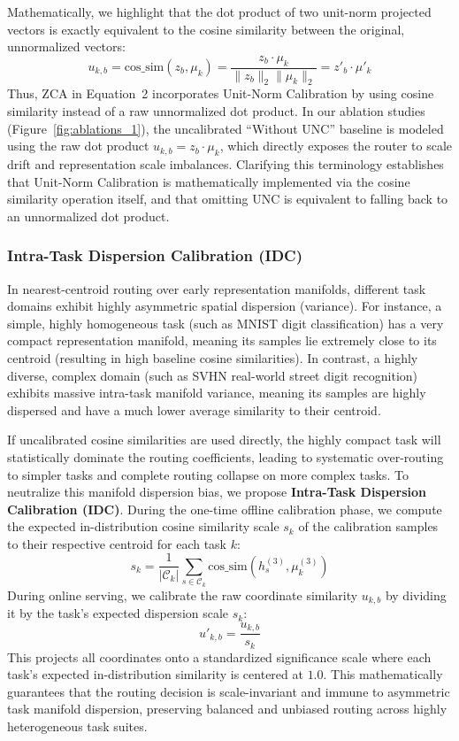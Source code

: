 Mathematically, we highlight that the dot product of two unit-norm projected vectors is exactly equivalent to the cosine similarity between the original, unnormalized vectors:
\begin{equation}
    u_{k, b} = \text{cos\_sim}(z_b, \mu_k) = \frac{z_b \cdot \mu_k}{\|z_b\|_2 \|\mu_k\|_2} = z'_b \cdot \mu'_k
\end{equation}
Thus, ZCA in Equation~2 incorporates Unit-Norm Calibration by using cosine similarity instead of a raw unnormalized dot product. In our ablation studies (Figure~\ref{fig:ablations_1}), the uncalibrated ``Without UNC'' baseline is modeled using the raw dot product $u_{k, b} = z_b \cdot \mu_k$, which directly exposes the router to scale drift and representation scale imbalances. Clarifying this terminology establishes that Unit-Norm Calibration is mathematically implemented via the cosine similarity operation itself, and that omitting UNC is equivalent to falling back to an unnormalized dot product.

\subsubsection{Intra-Task Dispersion Calibration (IDC)}
In nearest-centroid routing over early representation manifolds, different task domains exhibit highly asymmetric spatial dispersion (variance). For instance, a simple, highly homogeneous task (such as MNIST digit classification) has a very compact representation manifold, meaning its samples lie extremely close to its centroid (resulting in high baseline cosine similarities). In contrast, a highly diverse, complex domain (such as SVHN real-world street digit recognition) exhibits massive intra-task manifold variance, meaning its samples are highly dispersed and have a much lower average similarity to their centroid.

If uncalibrated cosine similarities are used directly, the highly compact task will statistically dominate the routing coefficients, leading to systematic over-routing to simpler tasks and complete routing collapse on more complex tasks.
To neutralize this manifold dispersion bias, we propose \textbf{Intra-Task Dispersion Calibration (IDC)}.
During the one-time offline calibration phase, we compute the expected in-distribution cosine similarity scale $s_k$ of the calibration samples to their respective centroid for each task $k$:
\begin{equation}
    s_k = \frac{1}{|\mathcal{C}_k|} \sum_{s \in \mathcal{C}_k} \text{cos\_sim}(h^{(3)}_s, \mu^{(3)}_k)
\end{equation}
During online serving, we calibrate the raw coordinate similarity $u_{k, b}$ by dividing it by the task's expected dispersion scale $s_k$:
\begin{equation}
    u'_{k, b} = \frac{u_{k, b}}{s_k}
\end{equation}
This projects all coordinates onto a standardized significance scale where each task's expected in-distribution similarity is centered at $1.0$. This mathematically guarantees that the routing decision is scale-invariant and immune to asymmetric task manifold dispersion, preserving balanced and unbiased routing across highly heterogeneous task suites.

